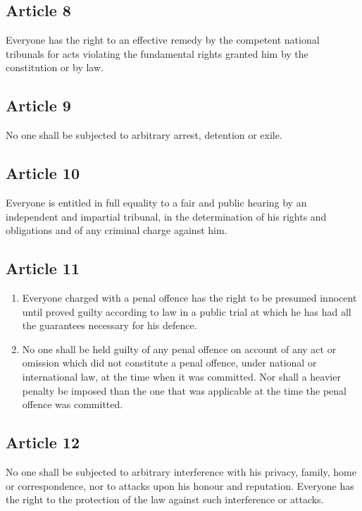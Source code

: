 \documentclass[
  ngerman,
  american,
  titlepage,
  openright,
  DIV=calc,
  toc=listof,
  listof=nochaptergap]{scrbook}
\begin{document}
\subsection{Article 8}\label{article-8-1}

Everyone has the right to an effective remedy by the competent national
tribunals for acts violating the fundamental rights granted him by the
constitution or by law.

\subsection{Article 9}\label{article-9-1}

No one shall be subjected to arbitrary arrest, detention or exile.

\subsection{Article 10}\label{article-10-1}

Everyone is entitled in full equality to a fair and public hearing by an
independent and impartial tribunal, in the determination of his rights
and obligations and of any criminal charge against him.

\subsection{Article 11}\label{article-11-1}

\begin{enumerate}
\def\labelenumi{\arabic{enumi}.}
\item
  Everyone charged with a penal offence has the right to be presumed
  innocent until proved guilty according to law in a public trial at
  which he has had all the guarantees necessary for his defence.
\item
  No one shall be held guilty of any penal offence on account of any act
  or omission which did not constitute a penal offence, under national
  or international law, at the time when it was committed. Nor shall a
  heavier penalty be imposed than the one that was applicable at the
  time the penal offence was committed.
\end{enumerate}

\subsection{Article 12}\label{article-12-1}

No one shall be subjected to arbitrary interference with his privacy,
family, home or correspondence, nor to attacks upon his honour and
reputation. Everyone has the right to the protection of the law against
such interference or attacks.
\end{document}

